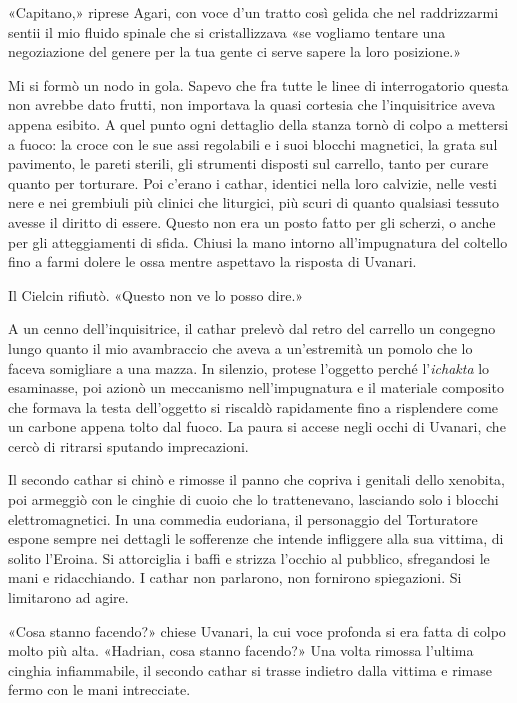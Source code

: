 «Capitano,» riprese Agari, con voce d'un tratto così gelida che nel
raddrizzarmi sentii il mio fluido spinale che si cristallizzava «se
vogliamo tentare una negoziazione del genere per la tua gente ci serve
sapere la loro posizione.»

Mi si formò un nodo in gola. Sapevo che fra tutte le linee di
interrogatorio questa non avrebbe dato frutti, non importava la quasi
cortesia che l'inquisitrice aveva appena esibito. A quel punto ogni
dettaglio della stanza tornò di colpo a mettersi a fuoco: la croce con
le sue assi regolabili e i suoi blocchi magnetici, la grata sul
pavimento, le pareti sterili, gli strumenti disposti sul carrello, tanto
per curare quanto per torturare. Poi c'erano i cathar, identici nella
loro calvizie, nelle vesti nere e nei grembiuli più clinici che
liturgici, più scuri di quanto qualsiasi tessuto avesse il diritto di
essere. Questo non era un posto fatto per gli scherzi, o anche per gli
atteggiamenti di sfida. Chiusi la mano intorno all'impugnatura del
coltello fino a farmi dolere le ossa mentre aspettavo la risposta di
Uvanari.

Il Cielcin rifiutò. «Questo non ve lo posso dire.»

A un cenno dell'inquisitrice, il cathar prelevò dal retro del carrello
un congegno lungo quanto il mio avambraccio che aveva a un'estremità un
pomolo che lo faceva somigliare a una mazza. In silenzio, protese
l'oggetto perché l'\emph{ichakta} lo esaminasse, poi azionò un
meccanismo nell'impugnatura e il materiale composito che formava la
testa dell'oggetto si riscaldò rapidamente fino a risplendere come un
carbone appena tolto dal fuoco. La paura si accese negli occhi di
Uvanari, che cercò di ritrarsi sputando imprecazioni.

Il secondo cathar si chinò e rimosse il panno che copriva i genitali
dello xenobita, poi armeggiò con le cinghie di cuoio che lo
trattenevano, lasciando solo i blocchi elettromagnetici. In una commedia
eudoriana, il personaggio del Torturatore espone sempre nei dettagli le
sofferenze che intende infliggere alla sua vittima, di solito l'Eroina.
Si attorciglia i baffi e strizza l'occhio al pubblico, sfregandosi le
mani e ridacchiando. I cathar non parlarono, non fornirono spiegazioni.
Si limitarono ad agire.

«Cosa stanno facendo?» chiese Uvanari, la cui voce profonda si era fatta
di colpo molto più alta. «Hadrian, cosa stanno facendo?» Una volta
rimossa l'ultima cinghia infiammabile, il secondo cathar si trasse
indietro dalla vittima e rimase fermo con le mani intrecciate.

